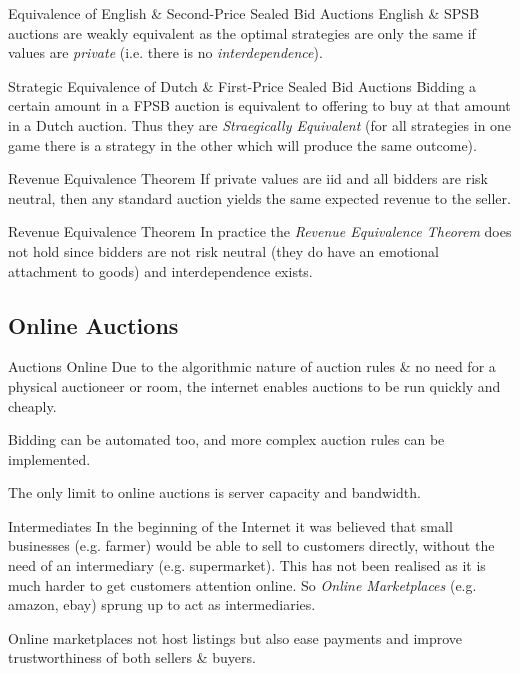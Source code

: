 \documentclass[11pt,a4paper]{article}
\begin{document}
\begin{remark}{Equivalence of English \& Second-Price Sealed Bid Auctions}
  English \& SPSB auctions are weakly equivalent as the optimal strategies are only the same if values are \textit{private} (i.e. there is no \textit{interdependence}).
\end{remark}

\begin{remark}{Strategic Equivalence of Dutch \& First-Price Sealed Bid Auctions}
  Bidding a certain amount in a FPSB auction is equivalent to offering to buy at that amount in a Dutch auction. Thus they are \textit{Straegically Equivalent} (for all strategies in one game there is a strategy in the other which will produce the same outcome).
\end{remark}

\begin{theorem}{Revenue Equivalence Theorem}
  If private values are iid and all bidders are risk neutral, then any standard auction yields the same expected revenue to the seller.
\end{theorem}

\begin{remark}{Revenue Equivalence Theorem}
  In practice the \textit{Revenue Equivalence Theorem} does not hold since bidders are not risk neutral (they do have an emotional attachment to goods) and interdependence exists.
\end{remark}

\subsection{Online Auctions}

\begin{remark}{Auctions Online}
  Due to the algorithmic nature of auction rules \& no need for a physical auctioneer or room, the internet enables auctions to be run quickly and cheaply.
  \par Bidding can be automated too, and more complex auction rules can be implemented.
  \par The only limit to online auctions is server capacity and bandwidth.
\end{remark}

\begin{remark}{Intermediates}
  In the beginning of the Internet it was believed that small businesses (e.g. farmer) would be able to sell to customers directly, without the need of an intermediary (e.g. supermarket). This has not been realised as it is much harder to get customers attention online. So \textit{Online Marketplaces} (e.g. amazon, ebay) sprung up to act as intermediaries.
  \par Online marketplaces not host listings but also ease payments and improve trustworthiness of both sellers \& buyers.
\end{remark}
\end{document}
